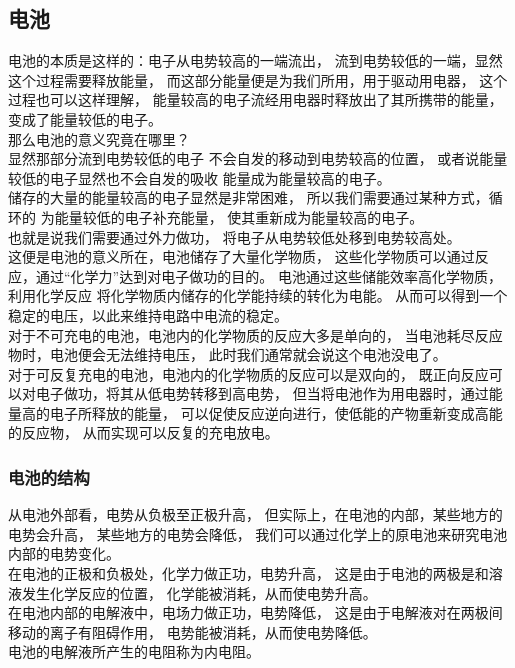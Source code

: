 \documentclass[UTF8]{ctexart}
\begin{document}
\newpage

\subsection{电池}
    电池的本质是这样的：电子从电势较高的一端流出，
    流到电势较低的一端，显然这个过程需要释放能量，
    而这部分能量便是为我们所用，用于驱动用电器，
    这个过程也可以这样理解，
    能量较高的电子流经用电器时释放出了其所携带的能量，
    变成了能量较低的电子。\\[3mm]
    那么电池的意义究竟在哪里？\\[3mm]
    显然那部分流到电势较低的电子
    不会自发的移动到电势较高的位置，
    或者说能量较低的电子显然也不会自发的吸收
    能量成为能量较高的电子。\\[3mm]
    储存的大量的能量较高的电子显然是非常困难，
    所以我们需要通过某种方式，循环的
    为能量较低的电子补充能量，
    使其重新成为能量较高的电子。\\[3mm]
    也就是说我们需要通过外力做功，
    将电子从电势较低处移到电势较高处。\\[3mm]
    这便是电池的意义所在，电池储存了大量化学物质，
    这些化学物质可以通过反应，通过“化学力”达到对电子做功的目的。
    电池通过这些储能效率高化学物质，利用化学反应
    将化学物质内储存的化学能持续的转化为电能。
    从而可以得到一个稳定的电压，以此来维持电路中电流的稳定。\\[3mm]
    对于不可充电的电池，电池内的化学物质的反应大多是单向的，
    当电池耗尽反应物时，电池便会无法维持电压，
    此时我们通常就会说这个电池没电了。\\[3mm]
    对于可反复充电的电池，电池内的化学物质的反应可以是双向的，
    既正向反应可以对电子做功，将其从低电势转移到高电势，
    但当将电池作为用电器时，通过能量高的电子所释放的能量，
    可以促使反应逆向进行，使低能的产物重新变成高能的反应物，
    从而实现可以反复的充电放电。\\

\subsubsection{电池的结构}
    从电池外部看，电势从负极至正极升高，
    但实际上，在电池的内部，某些地方的电势会升高，
    某些地方的电势会降低，
    我们可以通过化学上的原电池来研究电池内部的电势变化。\\[3mm]
    在电池的正极和负极处，化学力做正功，电势升高，
    这是由于电池的两极是和溶液发生化学反应的位置，
    化学能被消耗，从而使电势升高。\\[3mm]
    在电池内部的电解液中，电场力做正功，电势降低，
    这是由于电解液对在两极间移动的离子有阻碍作用，
    电势能被消耗，从而使电势降低。\\[3mm]
    电池的电解液所产生的电阻称为内电阻。
\end{document}

